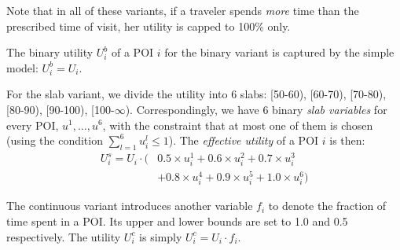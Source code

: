 Note that in all of these variants, if a traveler spends \emph{more} time
than the prescribed time of visit, her utility is capped to 100\% only.

The binary utility $U^b_i$ of a POI $i$ for the binary variant is captured
by the simple model: $U^b_i = U_i$.

For the slab variant, we divide the utility into 6 slabs: [50-60), [60-70),
[70-80), [80-90), [90-100), [100-$\infty$).  Correspondingly, we have 6 binary \emph{slab
variables} for every POI, $u^1, \dots, u^6$, with the constraint that at
most one of them is chosen (using the condition $\sum_{l=1}^6 u^l_i \leq 1$).  The \emph{effective
utility} of a POI $i$ is then:
%
\begin{align}
	\label{eq:slab}
	U^s_i = U_i \cdot ( & 0.5 \times u^1_i + 0.6 \times u^2_i + 0.7 \times u^3_i \nonumber \\
		& + 0.8 \times u^4_i + 0.9 \times u^5_i + 1.0 \times u^6_i )
\end{align}
%

The continuous variant introduces another variable $f_i$ to denote the fraction of time spent in a POI.
Its upper and lower bounds are set to 1.0 and 0.5 respectively.
The utility $U^c_i$ is simply $U^c_i = U_i \cdot f_i$.

